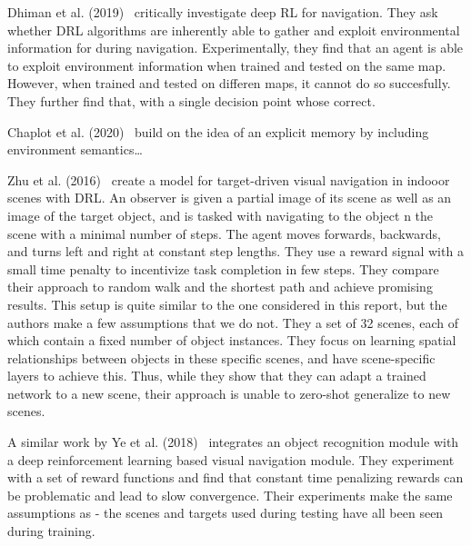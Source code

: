 Dhiman et al. (2019)~\cite{dhiman_critical_2019} critically investigate deep RL for navigation.
They ask whether DRL algorithms are inherently able to gather and exploit environmental information for during navigation.
Experimentally, they find that an agent is able to exploit environment information when trained and tested on the same map.
However, when trained and tested on differen maps, it cannot do so succesfully.
They further find that, with a single decision point whose correct.

Chaplot et al. (2020)~\cite{chaplot_semantic_2020} build on the idea of an explicit memory by including environment semantics\dots

Zhu et al. (2016)~\cite{zhu_target_driven_2016} create a model for target-driven visual navigation in indooor scenes with DRL.
An observer is given a partial image of its scene as well as an image of the target object, and is tasked with navigating to the object n the scene with a minimal number of steps.
The agent moves forwards, backwards, and turns left and right at constant step lengths.
They use a reward signal with a small time penalty to incentivize task completion in few steps.
They compare their approach to random walk and the shortest path and achieve promising results.
This setup is quite similar to the one considered in this report, but the authors make a few assumptions that we do not.
They a set of 32 scenes, each of which contain a fixed number of object instances.
They focus on learning spatial relationships between objects in these specific scenes, and have scene-specific layers to achieve this.
Thus, while they show that they can adapt a trained network to a new scene, their approach is unable to zero-shot generalize to new scenes.

A similar work by Ye et al. (2018)~\cite{ye_active_2018} integrates an object recognition module with a deep reinforcement learning based visual navigation module.
They experiment with a set of reward functions and find that constant time penalizing rewards can be problematic and lead to slow convergence.
Their experiments make the same assumptions as \cite{zhu_target_driven} - the scenes and targets used during testing have all been seen during training.

